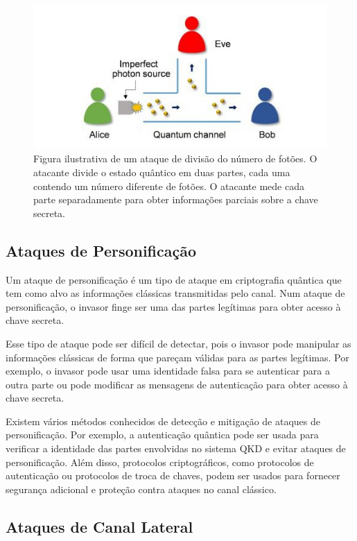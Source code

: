 \begin{figure}[!hbt]
  \centering
  \includegraphics[width=\textwidth]{images/foton-division-attack.jpg}
  \caption{Figura ilustrativa de um ataque de divisão do número de fotões. O atacante divide o estado quântico em duas partes, cada uma contendo um número diferente de fotões. O atacante mede cada parte separadamente para obter informações parciais sobre a chave secreta.}
  \label{fig:foton-division-attack}
\end{figure}
\FloatBarrier

\subsection{Ataques de Personificação}

Um ataque de personificação é um tipo de ataque em criptografia quântica que tem como alvo as informações clássicas transmitidas pelo canal. Num ataque de personificação, o invasor finge ser uma das partes legítimas para obter acesso à chave secreta.

Esse tipo de ataque pode ser difícil de detectar, pois o invasor pode manipular as informações clássicas de forma que pareçam válidas para as partes legítimas. Por exemplo, o invasor pode usar uma identidade falsa para se autenticar para a outra parte ou pode modificar as mensagens de autenticação para obter acesso à chave secreta.

Existem vários métodos conhecidos de detecção e mitigação de ataques de personificação. Por exemplo, a autenticação quântica pode ser usada para verificar a identidade das partes envolvidas no sistema QKD e evitar ataques de personificação. Além disso, protocolos criptográficos, como protocolos de autenticação ou protocolos de troca de chaves, podem ser usados para fornecer segurança adicional e proteção contra ataques no canal clássico.

\subsection{Ataques de Canal Lateral}

